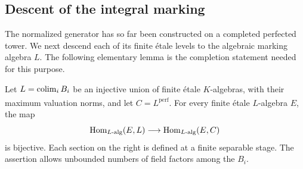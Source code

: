 \subsection{Descent of the integral marking}

The normalized generator has so far been constructed on a completed
perfected tower.  We next descend each of its finite étale levels to
the algebraic marking algebra $L$.  The following elementary lemma
is the completion statement needed for this purpose.

\begin{lemma}
\label{lem:finite-etale-descent}
Let $L=\operatorname*{colim}_i B_i$ be an injective union of finite étale
$K$-algebras, with their maximum valuation norms, and let
$C=\widehat{L^{\mathrm{perf}}}$.  For every finite étale
$L$-algebra $E$, the map
\[
 \operatorname{Hom}_{L\text{-alg}}(E,L)\longrightarrow
 \operatorname{Hom}_{L\text{-alg}}(E,C)
\]
is bijective.  Each section on the right is defined at a finite
separable stage.  The assertion allows unbounded numbers of field
factors among the $B_i$.
\end{lemma}

